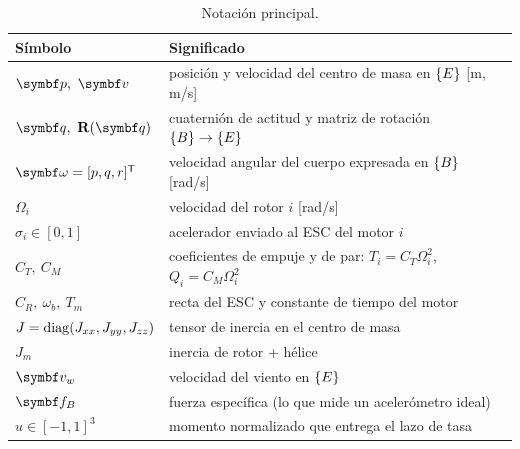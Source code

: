 \begin{table}[H]
\centering
\small
\caption{Notación principal.}
\label{tab:notacion}
\begin{tabularx}{\textwidth}{lX}
\toprule
Símbolo & Significado \\
\midrule
$\vect p,\ \vect v$ & posición y velocidad del centro de masa en $\{E\}$ [m, m/s] \\
$\vect q,\ \R(\vect q)$ & cuaternión de actitud y matriz de rotación $\{B\}\to\{E\}$ \\
$\vect\omega=[p,q,r]\T$ & velocidad angular del cuerpo expresada en $\{B\}$ [rad/s] \\
$\Omega_i$ & velocidad del rotor $i$ [rad/s] \\
$\sigma_i\in[0,1]$ & acelerador enviado al ESC del motor $i$ \\
$C_T,\ C_M$ & coeficientes de empuje y de par: $T_i=C_T\Omega_i^2$, $Q_i=C_M\Omega_i^2$ \\
$C_R,\ \omega_b,\ T_m$ & recta del ESC y constante de tiempo del motor \\
$J=\operatorname{diag}(J_{xx},J_{yy},J_{zz})$ & tensor de inercia en el centro de masa \\
$J_m$ & inercia de rotor + hélice \\
$\vect v_w$ & velocidad del viento en $\{E\}$ \\
$\vect f_B$ & fuerza específica (lo que mide un acelerómetro ideal) \\
$u\in[-1,1]^3$ & momento normalizado que entrega el lazo de tasa \\
\bottomrule
\end{tabularx}
\end{table}
